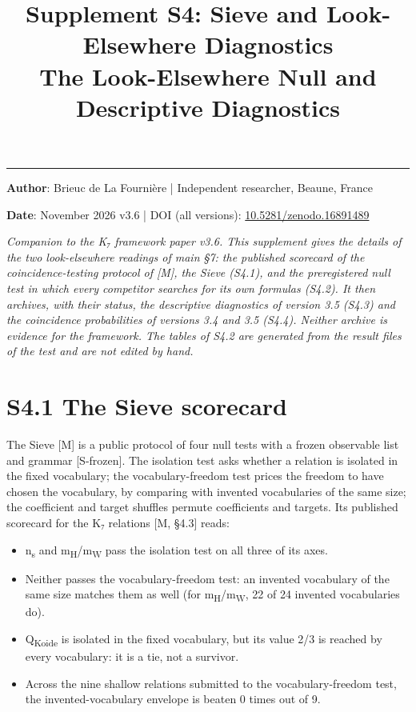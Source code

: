 \documentclass[11pt,a4paper]{article}
\title{%
\LARGE\textbf{Supplement S4: Sieve and Look-Elsewhere Diagnostics}\\[0.3em]
\large The Look-Elsewhere Null and Descriptive Diagnostics%
}
\author{}
\date{}
\begin{document}
\maketitle
\noindent\rule{\textwidth}{0.2pt}

\noindent\textbf{Author}: Brieuc de La Fourni\`ere \quad | \quad Independent researcher, Beaune, France

\noindent\textbf{Date}: November 2026 \quad v3.6 \quad | \quad DOI (all versions): \href{https://doi.org/10.5281/zenodo.16891489}{10.5281/zenodo.16891489}

\thispagestyle{fancy}

\emph{Companion to the K₇ framework paper v3.6. This supplement gives the details of the two look-elsewhere readings of main §7: the published scorecard of the coincidence-testing protocol of {[}M{]}, the Sieve (S4.1), and the preregistered null test in which every competitor searches for its own formulas (S4.2). It then archives, with their status, the descriptive diagnostics of version 3.5 (S4.3) and the coincidence probabilities of versions 3.4 and 3.5 (S4.4). Neither archive is evidence for the framework. The tables of S4.2 are generated from the result files of the test and are not edited by hand.}

\section{S4.1 The Sieve scorecard}\label{s4.1-the-sieve-scorecard}

The Sieve {[}M{]} is a public protocol of four null tests with a frozen observable list and grammar {[}S-frozen{]}. The isolation test asks whether a relation is isolated in the fixed vocabulary; the vocabulary-freedom test prices the freedom to have chosen the vocabulary, by comparing with invented vocabularies of the same size; the coefficient and target shuffles permute coefficients and targets. Its published scorecard for the K₇ relations {[}M, §4.3{]} reads:

\begin{itemize}
\tightlist
\item
  n\textsubscript{s} and m\textsubscript{H}/m\textsubscript{W} pass the isolation test on all three of its axes.
\item
  Neither passes the vocabulary-freedom test: an invented vocabulary of the same size matches them as well (for m\textsubscript{H}/m\textsubscript{W}, 22 of 24 invented vocabularies do).
\item
  Q\textsubscript{Koide} is isolated in the fixed vocabulary, but its value 2/3 is reached by every vocabulary: it is a tie, not a survivor.
\item
  Across the nine shallow relations submitted to the vocabulary-freedom test, the invented-vocabulary envelope is beaten 0 times out of 9.
\end{itemize}
\end{document}
